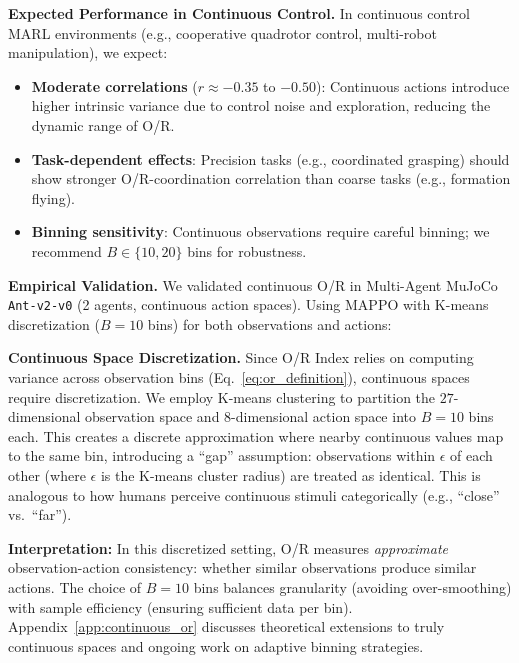 \documentclass[twoside]{article}
\theoremstyle{remark}
\begin{document}
\textbf{Expected Performance in Continuous Control.} In continuous control MARL environments (e.g., cooperative quadrotor control, multi-robot manipulation), we expect:
\begin{itemize}
    \item \textbf{Moderate correlations} ($r \approx -0.35$ to $-0.50$): Continuous actions introduce higher intrinsic variance due to control noise and exploration, reducing the dynamic range of O/R.
    \item \textbf{Task-dependent effects}: Precision tasks (e.g., coordinated grasping) should show stronger O/R-coordination correlation than coarse tasks (e.g., formation flying).
    \item \textbf{Binning sensitivity}: Continuous observations require careful binning; we recommend $B \in \{10, 20\}$ bins for robustness.
\end{itemize}

\textbf{Empirical Validation.} We validated continuous O/R in Multi-Agent MuJoCo \texttt{Ant-v2-v0} (2 agents, continuous action spaces). Using MAPPO with K-means discretization ($B=10$ bins) for both observations and actions:

\textbf{Continuous Space Discretization.} Since O/R Index relies on computing variance across observation bins (Eq.~\ref{eq:or_definition}), continuous spaces require discretization. We employ K-means clustering to partition the $27$-dimensional observation space and $8$-dimensional action space into $B=10$ bins each. This creates a discrete approximation where nearby continuous values map to the same bin, introducing a ``gap'' assumption: observations within $\epsilon$ of each other (where $\epsilon$ is the K-means cluster radius) are treated as identical. This is analogous to how humans perceive continuous stimuli categorically (e.g., ``close'' vs.\ ``far'').

\textbf{Interpretation:} In this discretized setting, O/R measures \emph{approximate} observation-action consistency: whether similar observations produce similar actions. The choice of $B=10$ bins balances granularity (avoiding over-smoothing) with sample efficiency (ensuring sufficient data per bin). Appendix~\ref{app:continuous_or} discusses theoretical extensions to truly continuous spaces and ongoing work on adaptive binning strategies.
\end{document}
